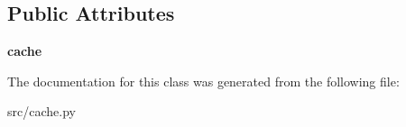 \subsection*{Public Attributes}
\begin{DoxyCompactItemize}
\item 
\hypertarget{classsrc_1_1cache_1_1_global_cache_a1ccbd28f4abef4193400d308a2b0df23}{}\label{classsrc_1_1cache_1_1_global_cache_a1ccbd28f4abef4193400d308a2b0df23} 
{\bfseries cache}
\end{DoxyCompactItemize}


The documentation for this class was generated from the following file\+:\begin{DoxyCompactItemize}
\item 
src/cache.\+py\end{DoxyCompactItemize}
